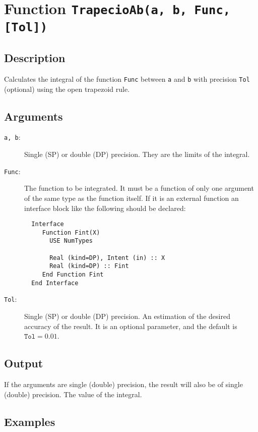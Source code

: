 \section{Function \texttt{TrapecioAb(a, b, Func, [Tol])}}

\subsection{Description}

Calculates the integral of the function \texttt{Func} between
\texttt{a} and \texttt{b} with precision \texttt{Tol} (optional) using
the open trapezoid rule.


\subsection{Arguments}

\begin{description}
\item[\texttt{a, b}:] Single (SP) or double (DP) precision. They are
  the limits of the integral.
\item[\texttt{Func}:] The function to be integrated. It must be a
  function of only one argument of the same type as the function
  itself. If it is an
  external function an interface block like the following should be
  declared: 
\begin{verbatim}
  Interface 
     Function Fint(X)
       USE NumTypes

       Real (kind=DP), Intent (in) :: X
       Real (kind=DP) :: Fint
     End Function Fint
  End Interface
\end{verbatim}
\item[\texttt{Tol}:] Single (SP) or double (DP) precision. An
  estimation of the desired accuracy of the result. It is an optional
  parameter, and the default is $\mathtt{Tol} = 0.01$. 
\end{description}


\subsection{Output}

If the arguments are single (double) precision, the result will also be of
single (double) precision. The value of the integral.



\subsection{Examples}

